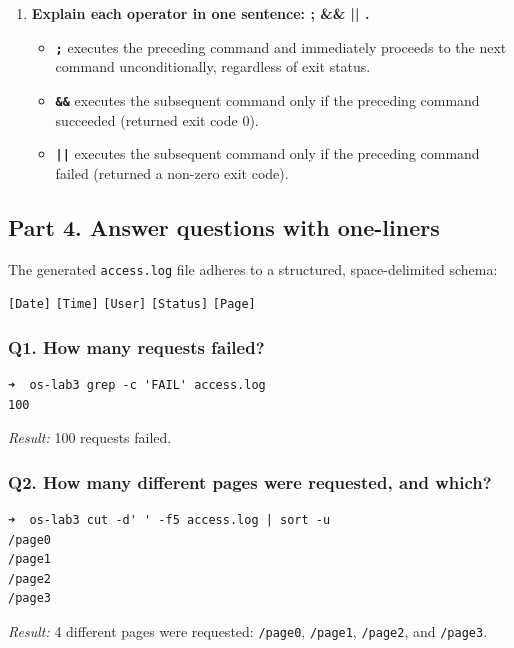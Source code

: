 \documentclass{labreport}
\begin{document}
\begin{enumerate}[leftmargin=*]
    \item \textbf{Explain each operator in one sentence: ; \&\& || .}
    \begin{itemize}[noitemsep, topsep=2pt]
        \item \textbf{\texttt{;}} executes the preceding command and immediately proceeds to the next command unconditionally, regardless of exit status.
        \item \textbf{\texttt{\&\&}} executes the subsequent command only if the preceding command succeeded (returned exit code 0).
        \item \textbf{\texttt{||}} executes the subsequent command only if the preceding command failed (returned a non-zero exit code).
    \end{itemize}
\end{enumerate}

\subsection{Part 4. Answer questions with one-liners}

The generated \texttt{access.log} file adheres to a structured, space-delimited schema:
\begin{center}
\texttt{[Date]} \quad \texttt{[Time]} \quad \texttt{[User]} \quad \texttt{[Status]} \quad \texttt{[Page]}
\end{center}

\subsubsection*{Q1. How many requests failed?}
\begin{lstlisting}[style=bash]
➜  os-lab3 grep -c 'FAIL' access.log
100
\end{lstlisting}
\textit{Result:} 100 requests failed.

\subsubsection*{Q2. How many different pages were requested, and which?}
\begin{lstlisting}[style=bash]
➜  os-lab3 cut -d' ' -f5 access.log | sort -u
/page0
/page1
/page2
/page3
\end{lstlisting}
\textit{Result:} 4 different pages were requested: \texttt{/page0}, \texttt{/page1}, \texttt{/page2}, and \texttt{/page3}.
\end{document}
